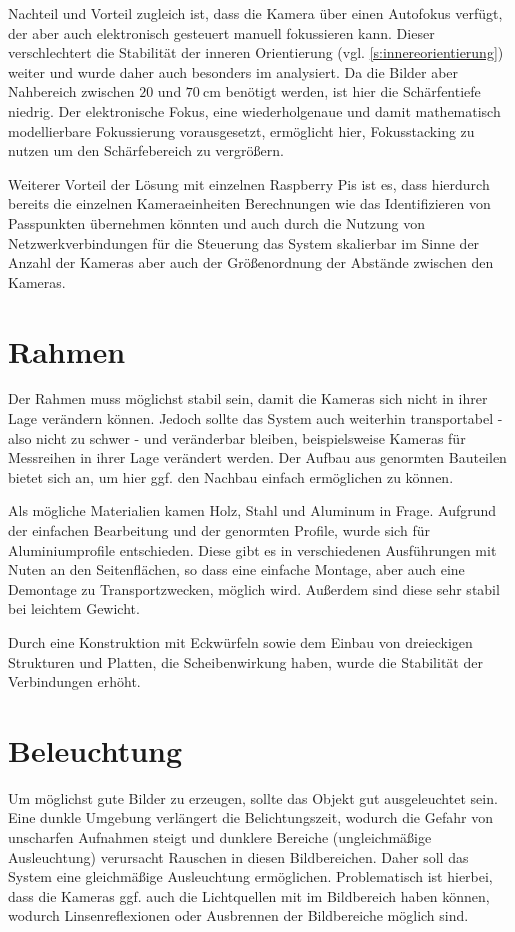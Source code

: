 \documentclass[a4paper,12pt,bibliography=totoc, listof=totoc,titlepage]{scrreprt}
\begin{document}
Nachteil und Vorteil zugleich ist, dass die Kamera über einen Autofokus verfügt, der aber auch elektronisch gesteuert manuell fokussieren kann. Dieser verschlechtert die Stabilität der inneren Orientierung (vgl. \autoref{s:innereorientierung}) weiter und wurde daher auch besonders im  analysiert. Da die Bilder aber Nahbereich zwischen $20$ und $70~\text{cm}$ benötigt werden, ist hier die Schärfentiefe niedrig. Der elektronische Fokus, eine wiederholgenaue und damit mathematisch modellierbare Fokussierung vorausgesetzt, ermöglicht hier, Fokusstacking zu nutzen um den Schärfebereich zu vergrößern.

Weiterer Vorteil der Lösung mit einzelnen Raspberry Pis ist es, dass hierdurch bereits die einzelnen Kameraeinheiten Berechnungen wie das Identifizieren von Passpunkten übernehmen könnten und auch durch die Nutzung von Netzwerkverbindungen für die Steuerung das System skalierbar im Sinne der Anzahl der Kameras aber auch der Größenordnung der Abstände zwischen den Kameras.

\section{Rahmen}
Der Rahmen muss möglichst stabil sein, damit die Kameras sich nicht in ihrer Lage verändern können. Jedoch sollte das System auch weiterhin transportabel - also nicht zu schwer - und veränderbar bleiben, beispielsweise Kameras für Messreihen in ihrer Lage verändert werden. Der Aufbau aus genormten Bauteilen bietet sich an, um hier ggf. den Nachbau einfach ermöglichen zu können.

Als mögliche Materialien kamen Holz, Stahl und Aluminum in Frage. Aufgrund der einfachen Bearbeitung und der genormten Profile, wurde sich für Aluminiumprofile entschieden. Diese gibt es in verschiedenen Ausführungen mit Nuten an den Seitenflächen, so dass eine einfache Montage, aber auch eine Demontage zu Transportzwecken, möglich wird. Außerdem sind diese sehr stabil bei leichtem Gewicht.

Durch eine Konstruktion mit Eckwürfeln sowie dem Einbau von dreieckigen Strukturen und Platten, die Scheibenwirkung haben, wurde die Stabilität der Verbindungen erhöht.

\section{Beleuchtung}
Um möglichst gute Bilder zu erzeugen, sollte das Objekt gut ausgeleuchtet sein. Eine dunkle Umgebung verlängert die Belichtungszeit, wodurch die Gefahr von unscharfen Aufnahmen steigt und dunklere Bereiche (ungleichmäßige Ausleuchtung) verursacht Rauschen in diesen Bildbereichen. Daher soll das System eine gleichmäßige Ausleuchtung ermöglichen. Problematisch ist hierbei, dass die Kameras ggf. auch die Lichtquellen mit im Bildbereich haben können, wodurch Linsenreflexionen oder Ausbrennen der Bildbereiche möglich sind.
\end{document}

